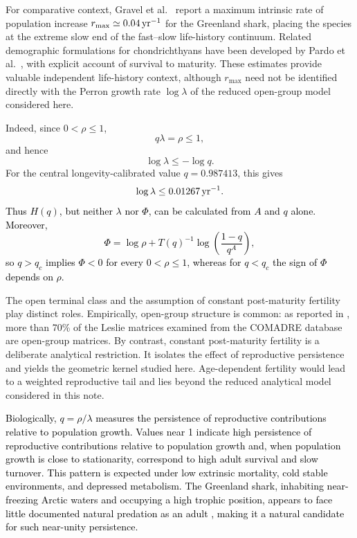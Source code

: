 \documentclass[11pt,a4paper]{amsart}
\begin{document}
For comparative context, Gravel et al.~\cite{Gravel2024} report a
maximum intrinsic rate of population increase
\(r_{\max}\simeq 0.04\,{\rm yr}^{-1}\) for the Greenland shark, placing
the species at the extreme slow end of the fast--slow life-history
continuum. Related demographic formulations for chondrichthyans have
been developed by Pardo et al.~\cite{Pardo2016}, with explicit account
of survival to maturity. These estimates provide valuable independent
life-history context, although \(r_{\max}\) need not be identified
directly with the Perron growth rate \(\log\lambda\) of the reduced
open-group model considered here.

Indeed, since \(0<\rho\leq 1\),
\[
q\lambda=\rho\leq 1,
\]
and hence
\begin{equation}
\label{eq:growth-bound}
\log\lambda\leq -\log q.
\end{equation}
For the central longevity-calibrated value \(q=0.987413\), this gives
\[
\log\lambda\leq 0.01267\,{\rm yr}^{-1}.
\]
\textcolor{black}{Thus \(H(q)\), but neither \(\lambda\) nor \(\Phi\), can be calculated
from \(A\) and \(q\) alone. Moreover,
\begin{equation}\label{eq:super}
\Phi=\log\rho+T(q)^{-1}\log\left(\frac{1-q}{q^A}\right),
\end{equation}
so \(q>q_c\) implies \(\Phi<0\) for every \(0<\rho\leq1\), whereas for
\(q<q_c\) the sign of \(\Phi\) depends on \(\rho\).}

The open terminal class and the assumption of constant post-maturity
fertility play distinct roles. Empirically, open-group structure is
common: as reported in \cite{BuescuElaydiOliveira2026}, more than
70\% of the Leslie matrices examined from the COMADRE database
\cite{SalgueroGomez2016COMADRE} are open-group matrices. By contrast,
constant post-maturity fertility is a deliberate analytical restriction.
It isolates the effect of reproductive persistence and yields the
geometric kernel studied here. Age-dependent fertility would lead to a
weighted reproductive tail and lies beyond the reduced analytical model
considered in this note.




\textcolor{black}{Biologically, $q = \rho/\lambda$ measures the persistence of reproductive contributions relative to population growth. 
Values near 1 indicate high persistence of reproductive contributions
relative to population growth and, when population growth is close to
stationarity, correspond to high adult survival and slow turnover. This pattern is expected under low extrinsic mortality, cold stable
environments, and depressed metabolism. The Greenland shark,
inhabiting near-freezing Arctic waters and occupying a high trophic
position, appears to face little documented natural predation as an
adult \cite{MacNeilEtAl2012,GrantEtAl2018}, making it a natural
candidate for such near-unity persistence.}
\end{document}
